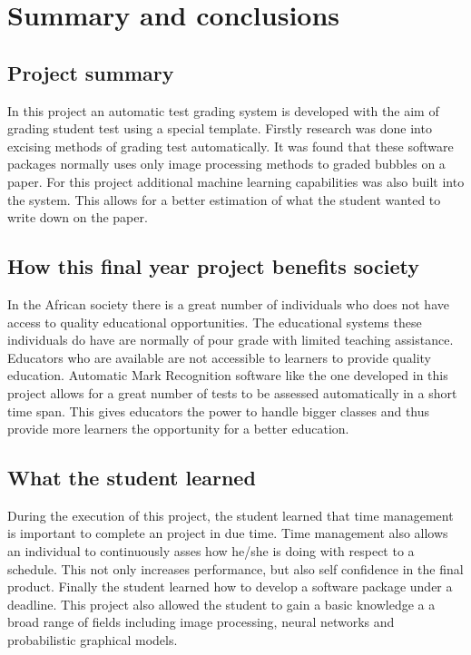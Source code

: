 \def\baselinestretch{1}
\chapter{Summary and conclusions}
\label{ch:Conclusions}

\graphicspath{{Conclusions/Figures_Conclusions/}}
\section{Project summary}

In this project an automatic test grading system is developed with the aim of grading student test using a special template. Firstly research was done into excising methods of grading test automatically. It was found that these software packages normally uses only image processing methods to graded bubbles on a paper. For this project additional machine learning capabilities was also built into the system. This allows for a better estimation of what the student  wanted to write down on the paper.

\section{How this final year project benefits society}
In the African society there is a great number of individuals who does not have access to quality educational opportunities. The educational systems these individuals do have are normally of pour grade with limited teaching assistance. Educators who are available are not accessible to learners to provide quality education. Automatic Mark Recognition software like the one developed in this project allows for a great number of tests to be assessed automatically in a short time span. This gives educators the power to handle bigger classes and thus provide more learners the opportunity for a better education.

\section{What the student learned}
During the execution of this project, the student learned that time management is important to complete an project in due time. Time management also allows an individual to continuously asses how he/she is doing with respect to a schedule. This not only increases performance, but also self confidence in the final product. Finally the student learned how to develop a software package under a deadline. This project also allowed the student to gain a basic knowledge a a broad range of fields including image processing, neural networks and probabilistic graphical models. 


